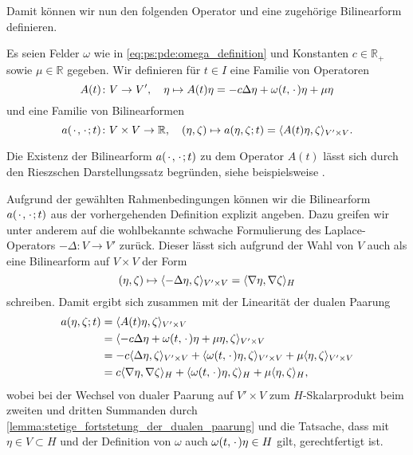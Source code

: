 Damit können wir nun den folgenden Operator und eine zugehörige Bilinearform definieren.

\begin{Definition}
\label{definition:prop:operator_und_bilinearform}
    Es seien Felder $\omega$ wie in \cref{eq:ps:pde:omega_definition} und Konstanten $c \in \mathbb{R}_{+}$ sowie $\mu \in \mathbb{R}$ gegeben.
    Wir definieren für $t \in I$ eine Familie von Operatoren
    \begin{equation}
        A(t) \colon V \to V', \quad \eta \mapsto A(t) \eta = - c \Delta \eta + \omega(t, {\mkern2mu\cdot\mkern2mu}) \eta + \mu \eta
    \end{equation}
    und eine Familie von Bilinearformen
    \begin{equation}
        a({\mkern2mu\cdot\mkern2mu}, {\mkern2mu\cdot\mkern2mu}; t) \colon V \times V \to \mathbb{R}, \quad (\eta, \zeta) \mapsto a(\eta, \zeta; t) = \langle A(t)\eta,\zeta\rangle_{V' \times V}.
    \end{equation}
\end{Definition}

\begin{Bemerkung}
\label{bemerkung:prop:biliniearform_riesz}
    Die Existenz der Bilinearform $a({\mkern2mu\cdot\mkern2mu}, {\mkern2mu\cdot\mkern2mu}; t)$ zu dem Operator $A(t)$ lässt sich durch den Rieszschen Darstellungssatz begründen, siehe beispielsweise \cite[Theorem \S{}22.1]{Halmos:1957vd}.
\end{Bemerkung}

Aufgrund der gewählten Rahmenbedingungen können wir die Bilinearform $a({\mkern2mu\cdot\mkern2mu}, {\mkern2mu\cdot\mkern2mu}; t)$ aus der vorhergehenden Definition explizit angeben.
Dazu greifen wir unter anderem auf die wohlbekannte schwache Formulierung des Laplace-Operators $- \Delta \colon V \to V'$ zurück.
Dieser lässt sich aufgrund der Wahl von $V$ auch als eine Bilinearform auf $V \times V$ der Form
\begin{equation}
    (\eta, \zeta) \mapsto \langle- \Delta \eta,\zeta\rangle_{V' \times V} = \langle\nabla \eta,\nabla \zeta\rangle_{H}
\end{equation}
schreiben.
Damit ergibt sich zusammen mit der Linearität der dualen Paarung
\begin{equation}
\label{eq:prop:bilinearform_darstellung}
    \begin{aligned}
        a(\eta, \zeta; t)
            &= \langle A(t) \eta,\zeta\rangle_{V' \times V}
          \\&= \langle-c\Delta \eta + \omega(t, {\mkern2mu\cdot\mkern2mu}) \eta + \mu \eta,\zeta\rangle_{V' \times V}
          \\&= - c\langle\Delta \eta,\zeta\rangle_{V' \times V} + \langle\omega(t, {\mkern2mu\cdot\mkern2mu}) \eta,\zeta\rangle_{V' \times V} + \mu \langle\eta,\zeta\rangle_{V' \times V}
          \\&= c\langle\nabla \eta,\nabla \zeta\rangle_{H} + \langle\omega(t, {\mkern2mu\cdot\mkern2mu}) \eta,\zeta\rangle_{H} + \mu \langle\eta,\zeta\rangle_{H},
    \end{aligned}
\end{equation}
wobei bei der Wechsel von dualer Paarung auf $V' \times V$ zum $H$-Skalarprodukt beim zweiten und dritten Summanden durch \cref{lemma:stetige_fortstetung_der_dualen_paarung} und die Tatsache, dass mit $\eta \in V \subset H$ und der Definition von $\omega$ auch $\omega(t, {\mkern2mu\cdot\mkern2mu}) \eta \in H$ gilt, gerechtfertigt ist.


